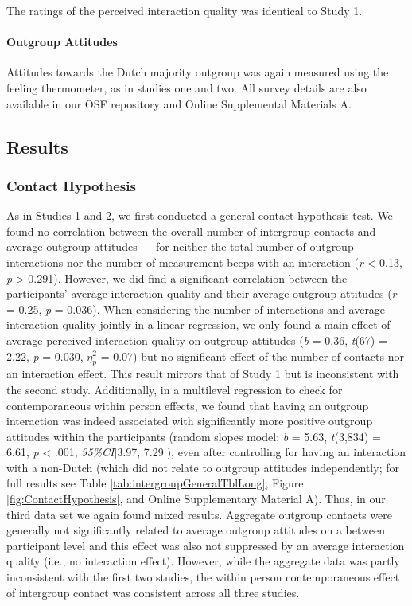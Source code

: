 The ratings of the perceived interaction quality was identical to Study
1.

\paragraph{Outgroup Attitudes}

Attitudes towards the Dutch majority outgroup was again measured using
the feeling thermometer, as in studies one and two. All survey details
are also available in our OSF repository \citep{KreienkampMasked2022a}
and Online Supplemental Materials A.

\subsection{Results}

\subsubsection{Contact Hypothesis}

As in Studies 1 and 2, we first conducted a general contact hypothesis
test. We found no correlation between the overall number of intergroup
contacts and average outgroup attitudes --- for neither the total number
of outgroup interactions nor the number of measurement beeps with an
interaction (\textbar{}\textit{r}\textbar{} \textless{} 0.13, \textit{p}
\textgreater{} 0.291). However, we did find a significant correlation
between the participants' average interaction quality and their average
outgroup attitudes (\textit{r} = 0.25, \textit{p} = 0.036). When
considering the number of interactions and average interaction quality
jointly in a linear regression, we only found a main effect of average
perceived interaction quality on outgroup attitudes (\textit{b} = 0.36,
\textit{t}(67) = 2.22, \textit{p} = 0.030, \(\eta_p^2\) = 0.07) but no
significant effect of the number of contacts nor an interaction effect.
This result mirrors that of Study 1 but is inconsistent with the second
study. Additionally, in a multilevel regression to check for
contemporaneous within person effects, we found that having an outgroup
interaction was indeed associated with significantly more positive
outgroup attitudes within the participants (random slopes model;
\textit{b} = 5.63, \textit{t}(3,834) = 6.61, \textit{p} \textless{}
.001, \textit{95\%CI}{[}3.97, 7.29{]}), even after controlling for
having an interaction with a non-Dutch (which did not relate to outgroup
attitudes independently; for full results see Table
\ref{tab:intergroupGeneralTblLong}, Figure \ref{fig:ContactHypothesis},
and Online Supplementary Material A). Thus, in our third data set we
again found mixed results. Aggregate outgroup contacts were generally
not significantly related to average outgroup attitudes on a between
participant level and this effect was also not suppressed by an average
interaction quality (i.e., no interaction effect). However, while the
aggregate data was partly inconsistent with the first two studies, the
within person contemporaneous effect of intergroup contact was
consistent across all three studies.


